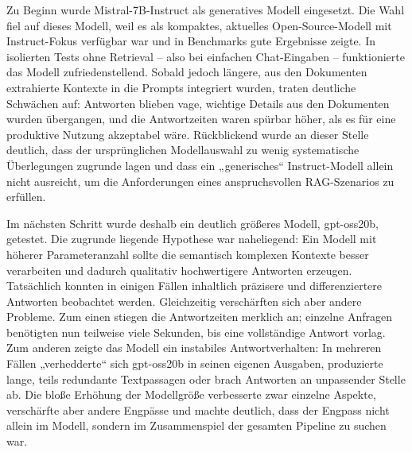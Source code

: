 Zu Beginn wurde Mistral-7B-Instruct als generatives Modell eingesetzt.
Die Wahl fiel auf dieses Modell, weil es als kompaktes, aktuelles Open-Source-Modell mit Instruct-Fokus verfügbar war und in Benchmarks gute Ergebnisse zeigte.
In isolierten Tests ohne Retrieval – also bei einfachen Chat-Eingaben – funktionierte das Modell zufriedenstellend.
Sobald jedoch längere, aus den Dokumenten extrahierte Kontexte in die Prompts integriert wurden, traten deutliche Schwächen auf:
Antworten blieben vage, wichtige Details aus den Dokumenten wurden übergangen, und die Antwortzeiten waren spürbar höher, als es für eine produktive Nutzung akzeptabel wäre.
Rückblickend wurde an dieser Stelle deutlich, dass der ursprünglichen Modellauswahl zu wenig systematische Überlegungen zugrunde lagen und dass ein „generisches“ Instruct-Modell allein nicht ausreicht, um die Anforderungen eines anspruchsvollen RAG-Szenarios zu erfüllen.

Im nächsten Schritt wurde deshalb ein deutlich größeres Modell, gpt-oss20b, getestet.
Die zugrunde liegende Hypothese war naheliegend: Ein Modell mit höherer Parameteranzahl sollte die semantisch komplexen Kontexte besser verarbeiten und dadurch qualitativ hochwertigere Antworten erzeugen.
Tatsächlich konnten in einigen Fällen inhaltlich präzisere und differenziertere Antworten beobachtet werden.
Gleichzeitig verschärften sich aber andere Probleme.
Zum einen stiegen die Antwortzeiten merklich an; einzelne Anfragen benötigten nun teilweise viele Sekunden, bis eine vollständige Antwort vorlag.
Zum anderen zeigte das Modell ein instabiles Antwortverhalten:
In mehreren Fällen „verhedderte“ sich gpt-oss20b in seinen eigenen Ausgaben, produzierte lange, teils redundante Textpassagen oder brach Antworten an unpassender Stelle ab.
Die bloße Erhöhung der Modellgröße verbesserte zwar einzelne Aspekte, verschärfte aber andere Engpässe und machte deutlich, dass der Engpass nicht allein im Modell, sondern im Zusammenspiel der gesamten Pipeline zu suchen war.


